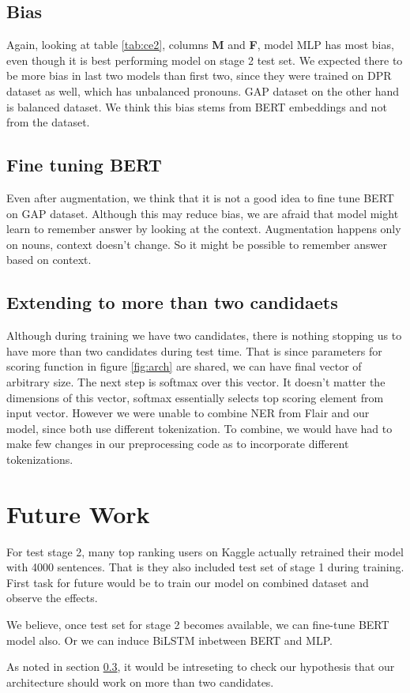 \documentclass[11pt,a4paper]{article}
\begin{document}
\subsection{Bias}
\label{sec:bias}
Again, looking at table \ref{tab:ce2}, columns \textbf{M} and \textbf{F}, model MLP has most bias, even though it is best performing model on stage 2 test set. We expected there to be more bias in last two models than first two, since they were trained on DPR dataset as well, which has unbalanced pronouns. GAP dataset on the other hand is balanced dataset. We think this bias stems from BERT embeddings and not from the dataset.

\subsection{Fine tuning BERT}
Even after augmentation, we think that it is not a good idea to fine tune BERT on GAP dataset. Although this may reduce bias, we are afraid that model might learn to remember answer by looking at the context. Augmentation happens only on nouns, context doesn't change. So it might be possible to remember answer based on context. %

\subsection{Extending to more than two candidaets}
\label{subsec:morecandidates}
Although during training we have two candidates, there is nothing stopping us to have more than two candidates during test time. That is since parameters for scoring function in figure \ref{fig:arch} are shared, we can have final vector of arbitrary size. The next step is softmax over this vector. It doesn't matter the dimensions of this vector, softmax essentially selects top scoring element from input vector. However we were unable to combine NER from Flair and our model, since both use different tokenization. To combine, we would have had to make few changes in our preprocessing code as to incorporate different tokenizations.

\section{Future Work}
For test stage 2, many top ranking users on Kaggle actually retrained their model with 4000 sentences. That is they also included test set of stage 1 during training. First task for future would be to train our model on combined dataset and observe the effects.

We believe, once test set for stage 2 becomes available, we can fine-tune BERT model also. Or we can induce BiLSTM inbetween BERT and MLP.

As noted in section \ref{subsec:morecandidates}, it would be intreseting to check our hypothesis that our architecture should work on more than two candidates.




\end{document}
